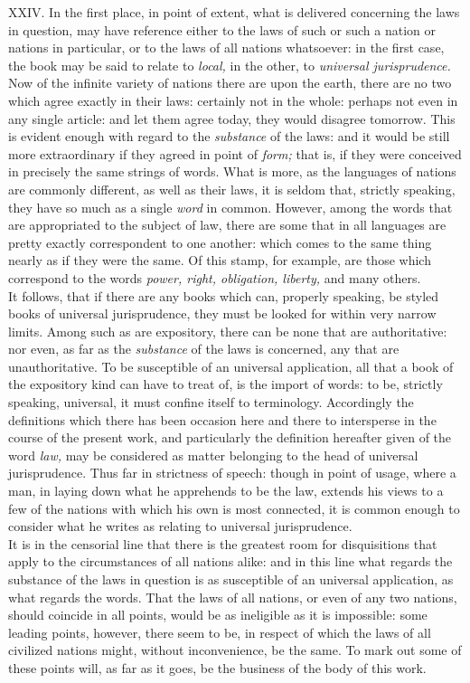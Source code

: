 \documentclass[12pt]{report}
\begin{document}
XXIV. In the first place, in point of extent, what is delivered
concerning the laws in question, may have reference either to the laws
of such or such a nation or nations in particular, or to the laws of all
nations whatsoever: in the first case, the book may be said to relate to
\emph{local,} in the other, to \emph{universal jurisprudence.} \emph{\\
}Now of the infinite variety of nations there are upon the earth, there
are no two which agree exactly in their laws: certainly not in the
whole: perhaps not even in any single article: and let them agree today,
they would disagree tomorrow. This is evident enough with regard to the
\emph{substance} of the laws: and it would be still more extraordinary
if they agreed in point of \emph{form;} that is, if they were conceived
in precisely the same strings of words. What is more, as the languages
of nations are commonly different, as well as their laws, it is seldom
that, strictly speaking, they have so much as a single \emph{word} in
common. However, among the words that are appropriated to the subject of
law, there are some that in all languages are pretty exactly
correspondent to one another: which comes to the same thing nearly as if
they were the same. Of this stamp, for example, are those which
correspond to the words \emph{power, right, obligation, liberty,} and
many others.\\
It follows, that if there are any books which can, properly speaking, be
styled books of universal jurisprudence, they must be looked for within
very narrow limits. Among such as are expository, there can be none that
are authoritative: nor even, as far as the \emph{substance} of the laws
is concerned, any that are unauthoritative. To be susceptible of an
universal application, all that a book of the expository kind can have
to treat of, is the import of words: to be, strictly speaking,
universal, it must confine itself to terminology. Accordingly the
definitions which there has been occasion here and there to intersperse
in the course of the present work, and particularly the definition
hereafter given of the word \emph{law,} may be considered as matter
belonging to the head of universal jurisprudence. Thus far in strictness
of speech: though in point of usage, where a man, in laying down what he
apprehends to be the law, extends his views to a few of the nations with
which his own is most connected, it is common enough to consider what he
writes as relating to universal jurisprudence.\\
It is in the censorial line that there is the greatest room for
disquisitions that apply to the circumstances of all nations alike: and
in this line what regards the substance of the laws in question is as
susceptible of an universal application, as what regards the words. That
the laws of all nations, or even of any two nations, should coincide in
all points, would be as ineligible as it is impossible: some leading
points, however, there seem to be, in respect of which the laws of all
civilized nations might, without inconvenience, be the same. To mark out
some of these points will, as far as it goes, be the business of the
body of this work.
\end{document}
